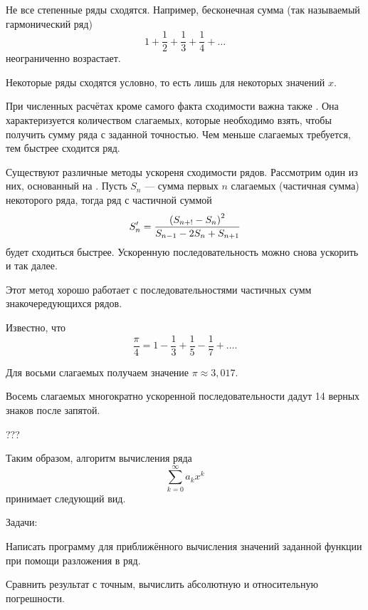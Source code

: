 Не все степенные ряды сходятся. Например, бесконечная сумма (так
называемый гармонический ряд)
\[
1+\frac{1}{2}+\frac{1}{3}+\frac{1}{4}+\ldots
\]
неограниченно возрастает.

Некоторые ряды сходятся условно, то есть лишь для некоторых значений
$x$.

При численных расчётах кроме самого факта сходимости важна также
. Она характеризуется
количеством слагаемых, которые необходимо взять, чтобы получить сумму
ряда с заданной точностью. Чем меньше слагаемых требуется, тем быстрее
сходится ряд.


Существуют различные методы ускореня сходимости рядов. Рассмотрим один из них,
основанный на . Пусть $S_n$ —
сумма первых $n$ слагаемых (частичная сумма) некоторого ряда, тогда
ряд с частичной суммой
\[
S'_n = {\left(S_{n+!} - S_n\right)^2 \over S_{n-1} - 2 S_n + S_{n+1}}
\]
будет сходиться быстрее. Ускоренную последовательность можно снова
ускорить и так далее.

Этот метод хорошо работает с последовательностями частичных сумм
знакочередующихся рядов.

\begin{example}
Известно, что
\[
\frac{\pi}4 = 1 - \frac13 + \frac15 - \frac17 + \ldots.
\]

Для восьми слагаемых получаем значение $\pi \approx 3{,}017$.

Восемь слагаемых многократно ускоренной последовательности дадут 14
верных знаков после запятой.
\end{example}

\Practice


???

Таким образом, алгоритм вычисления ряда
\[
\sum_{k=0}^{\infty}a_{k}x^{k}
\]
принимает следующий вид.


%
%

\Tasks

Задачи:

Написать программу для приближённого вычисления значений заданной
функции при помощи разложения в ряд.

Сравнить результат с точным, вычислить абсолютную и относительную
погрешности.

